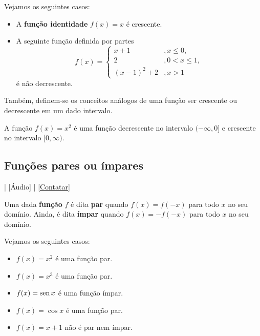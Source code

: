 \begin{ex}
  Vejamos os seguintes casos:
  \begin{itemize}
  \item A {\bf função identidade} $f(x)=x$ é crescente.
  \item A seguinte função definida por partes
    \begin{equation}
      f(x) = \left\{
        \begin{array}{ll}
          x+1 &,x\leq 0,\\
          2 &,0<x\leq 1,\\
          (x-1)^2+2 &, x>1
        \end{array}
\right.
\end{equation}
é não decrescente.
  \end{itemize}
\end{ex}

Também, definem-se os conceitos análogos de uma função ser crescente ou decrescente em um dado intervalo.

\begin{ex}
  A função $f(x) = x^2$ é uma função decrescente no intervalo $(-\infty, 0]$ e crescente no intervalo $[0, \infty)$.
\end{ex}

\subsection{Funções pares ou ímpares}

\begin{flushright}
  [Vídeo] | [Áudio] | \href{https://phkonzen.github.io/notas/contato.html}{[Contatar]}
\end{flushright}

Uma dada {\bf função} $f$ é dita {\bf par} quando $f(x)=f(-x)$ para todo $x$ no seu domínio. Ainda, é dita {\bf ímpar} quando $f(x)=-f(-x)$ para todo $x$ no seu domínio.

\begin{ex}
  Vejamos os seguintes casos:
  \begin{itemize}
  \item $f(x) = x^2$ é uma função par.
  \item $f(x) = x^3$ é uma função par.
  \item $f(x) = \operatorname{sen} x$ é uma função ímpar.
  \item $f(x) = \cos x$ é uma função par.
  \item $f(x) = x+1$ não é par nem ímpar.
  \end{itemize}
\end{ex}

